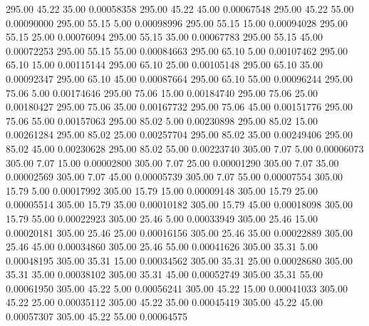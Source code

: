     295.00     45.22     35.00     0.00058358
    295.00     45.22     45.00     0.00067548
    295.00     45.22     55.00     0.00090000
    295.00     55.15      5.00     0.00098996
    295.00     55.15     15.00     0.00094028
    295.00     55.15     25.00     0.00076094
    295.00     55.15     35.00     0.00067783
    295.00     55.15     45.00     0.00072253
    295.00     55.15     55.00     0.00084663
    295.00     65.10      5.00     0.00107462
    295.00     65.10     15.00     0.00115144
    295.00     65.10     25.00     0.00105148
    295.00     65.10     35.00     0.00092347
    295.00     65.10     45.00     0.00087664
    295.00     65.10     55.00     0.00096244
    295.00     75.06      5.00     0.00174646
    295.00     75.06     15.00     0.00184740
    295.00     75.06     25.00     0.00180427
    295.00     75.06     35.00     0.00167732
    295.00     75.06     45.00     0.00151776
    295.00     75.06     55.00     0.00157063
    295.00     85.02      5.00     0.00230898
    295.00     85.02     15.00     0.00261284
    295.00     85.02     25.00     0.00257704
    295.00     85.02     35.00     0.00249406
    295.00     85.02     45.00     0.00230628
    295.00     85.02     55.00     0.00223740
    305.00      7.07      5.00     0.00006073
    305.00      7.07     15.00     0.00002800
    305.00      7.07     25.00     0.00001290
    305.00      7.07     35.00     0.00002569
    305.00      7.07     45.00     0.00005739
    305.00      7.07     55.00     0.00007554
    305.00     15.79      5.00     0.00017992
    305.00     15.79     15.00     0.00009148
    305.00     15.79     25.00     0.00005514
    305.00     15.79     35.00     0.00010182
    305.00     15.79     45.00     0.00018098
    305.00     15.79     55.00     0.00022923
    305.00     25.46      5.00     0.00033949
    305.00     25.46     15.00     0.00020181
    305.00     25.46     25.00     0.00016156
    305.00     25.46     35.00     0.00022889
    305.00     25.46     45.00     0.00034860
    305.00     25.46     55.00     0.00041626
    305.00     35.31      5.00     0.00048195
    305.00     35.31     15.00     0.00034562
    305.00     35.31     25.00     0.00028680
    305.00     35.31     35.00     0.00038102
    305.00     35.31     45.00     0.00052749
    305.00     35.31     55.00     0.00061950
    305.00     45.22      5.00     0.00056241
    305.00     45.22     15.00     0.00041033
    305.00     45.22     25.00     0.00035112
    305.00     45.22     35.00     0.00045419
    305.00     45.22     45.00     0.00057307
    305.00     45.22     55.00     0.00064575
